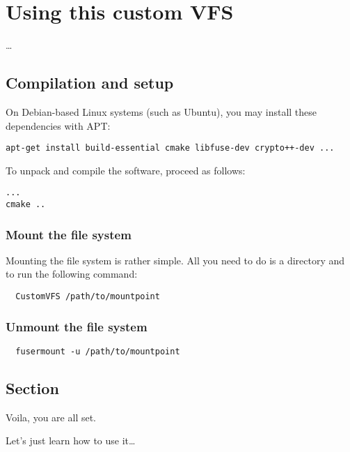 \chapter{Using this custom VFS}

\ldots

\section*{Compilation and setup}

On Debian-based Linux systems (such as Ubuntu), you may install these dependencies with APT:


\begin{Verbatim}
apt-get install build-essential cmake libfuse-dev crypto++-dev ...
\end{Verbatim}

To unpack and compile the software, proceed as follows:

\begin{Verbatim}
...
cmake ..
\end{Verbatim}

\subsection*{Mount the file system}

Mounting the file system is rather simple.
All you need to do is a directory and to run the following command:

\begin{Verbatim}
  CustomVFS /path/to/mountpoint
\end{Verbatim}


\subsection*{Unmount the file system}

\begin{Verbatim}
  fusermount -u /path/to/mountpoint
\end{Verbatim}

\section*{Section}

Voila, you are all set.

Let's just learn how to use it\ldots